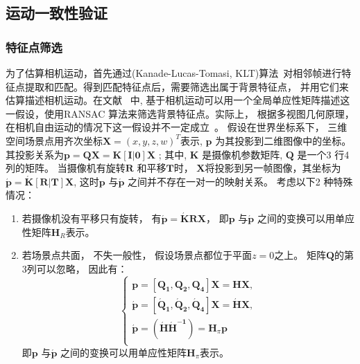 \subsection{运动一致性验证}
\label{ch5:sec:sub:motionv}

\subsubsection{特征点筛选}
\label{ch5:sec:sub:sub:fp}
 为了估算相机运动，首先通过(Kanade-Lucas-Tomasi, KLT)算法~\cite{KLT}对相邻帧进行特征点提取和匹配。得到匹配特征点后，需要筛选出属于背景特征点， 并用它们来估算描述相机运动。在文献~\cite{5.8s} 中, 基于相机运动可以用一个全局单应性矩阵描述这一假设，使用RANSAC 算法来筛选背景特征点。实际上， 根据多视图几何原理，在相机自由运动的情况下这一假设并不一定成立~\cite{Multitransform}。 假设在世界坐标系下， 三维空间场景点用齐次坐标$\mathbf{X}={(x,y,z,w)}^T$表示, $\mathbf{p}$ 为其投影到二维图像中的坐标。其投影关系为$\mathbf{p} = \mathbf{QX} = \mathbf{K[I|0]X}$ ; 其中, $\mathbf{K}$ 是摄像机参数矩阵, $\mathbf{Q}$ 是一个3 行4 列的矩阵。 当摄像机有旋转$\mathbf{R}$ 和平移$\mathbf{T}$时， $\mathbf{X}$将投影到另一帧图像，其坐标为 $\mathbf{\acute{p}}=\mathbf{\acute{K}[R|T]X}$, 这时$\mathbf{p}$ 与$\mathbf{\acute{p}}$ 之间并不存在一对一的映射关系。 考虑以下2 种特殊情况：
 \begin{enumerate}
   \item 若摄像机没有平移只有旋转， 有$\mathbf{\acute{p}}=\mathbf{\acute{K}RX}$， 即$\mathbf{p}$ 与$\mathbf{\acute{p}}$ 之间的变换可以用单应性矩阵$\mathbf{H}_R$表示。
   \item 若场景点共面， 不失一般性， 假设场景点都位于平面$z=0$之上。 矩阵$\mathbf{Q}$的第3列可以忽略， 因此有：
   \begin{equation}
   \begin{cases}
    \mathbf{p}=[\mathbf{Q_1},\mathbf{Q_2},\mathbf{Q_4}]\mathbf{X} = \mathbf{HX},   \\
   \mathbf{\acute{p}}=[\mathbf{\acute{Q}_1},\mathbf{\acute{Q}_2},\mathbf{\acute{Q}_4}]\mathbf{X} = \mathbf{\acute{H}X},  \\
    \mathbf{\acute{p}} = (\mathbf{\acute{H}\acute{H}^{-1}})=\mathbf{H}_{\pi} \mathbf{p}  \\
   \end{cases}
   \end{equation}
  即$\mathbf{p}$ 与$\mathbf{\acute{p}}$ 之间的变换可以用单应性矩阵$\mathbf{H}_{\pi}$表示。
 \end{enumerate}


